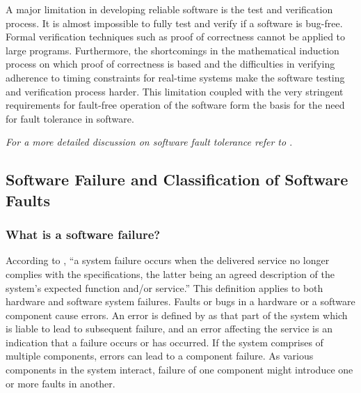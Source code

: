 \documentclass[a4paper, 11pt]{article}
\begin{document}
A major limitation in developing reliable software is the test and verification process. It is almost impossible to fully test and verify if a software is bug-free. Formal verification techniques such as proof of correctness cannot be applied to large programs. Furthermore, the shortcomings in the mathematical induction process on which proof of correctness is based and the difficulties in verifying adherence to timing constraints for real-time systems make the software testing and verification process harder. This limitation coupled with the very stringent requirements for fault-free operation of the software form the basis for the need for fault tolerance in software.

\emph{For a more detailed discussion on software fault tolerance refer to \citet{checkpointing}}.

\subsection{Software Failure and Classification of Software Faults}
\subsubsection{What is a software failure?}
According to \citet{laprie1992dependability}, ``a system failure occurs when the delivered service no longer complies with the specifications, the latter being an agreed description of the system's expected function and/or service.'' This definition applies to both hardware and software system failures. Faults or bugs in a hardware or a software component cause errors. An error is defined by \citet{laprie1992dependability} as that part of the system which is liable to lead to subsequent failure, and an error affecting the service is an indication that a failure occurs or has occurred. If the system comprises of multiple components, errors can lead to a component failure. As various components in the system interact, failure of one component might introduce one or more faults in another.
\end{document}
